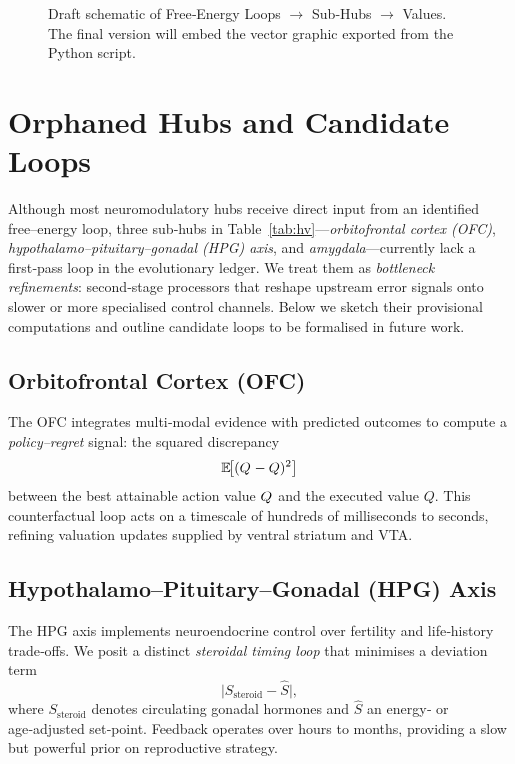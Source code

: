 \documentclass[11pt]{article}
\begin{document}
\begin{figure}[h]
  \centering
  \fbox{\rule{0pt}{6cm}\rule{12cm}{0pt}}%
  \caption{Draft schematic of Free‑Energy Loops \(\rightarrow\) Sub‑Hubs \(\rightarrow\) Values.
           The final version will embed the vector graphic exported from the Python script.}
  \label{fig:lhvchart}
\end{figure}

\section{Orphaned Hubs and Candidate Loops}\label{sec:orphans}
Although most neuromodulatory hubs receive direct input from an identified free–energy loop, three sub‑hubs in Table~\ref{tab:hv}—\emph{orbitofrontal cortex (OFC)}, \emph{hypothalamo–pituitary–gonadal (HPG) axis}, and \emph{amygdala}—currently lack a first‑pass loop in the evolutionary ledger.  
We treat them as \emph{bottleneck refinements}: second‑stage processors that reshape upstream error signals onto slower or more specialised control channels.  
Below we sketch their provisional computations and outline candidate loops to be formalised in future work.

\subsection{Orbitofrontal Cortex (OFC)}
The OFC integrates multi‑modal evidence with predicted outcomes to compute a \emph{policy–regret} signal: the squared discrepancy
\[
\mathbb{E}\!\bigl[(Q^{\*}-Q)^{2}\bigr]
\]
between the best attainable action value \(Q^{\*}\) and the executed value \(Q\).
This counterfactual loop acts on a timescale of hundreds of milliseconds to seconds, refining valuation updates supplied by ventral striatum and VTA.

\subsection{Hypothalamo–Pituitary–Gonadal (HPG) Axis}
The HPG axis implements neuroendocrine control over fertility and life‑history trade‑offs.  
We posit a distinct \emph{steroidal timing loop} that minimises a deviation term
\[
\bigl|S_{\text{steroid}}-\hat S\bigr|,
\]
where \(S_{\text{steroid}}\) denotes circulating gonadal hormones and \(\hat S\) an energy‑ or age‑adjusted set‑point.  
Feedback operates over hours to months, providing a slow but powerful prior on reproductive strategy.
\end{document}

